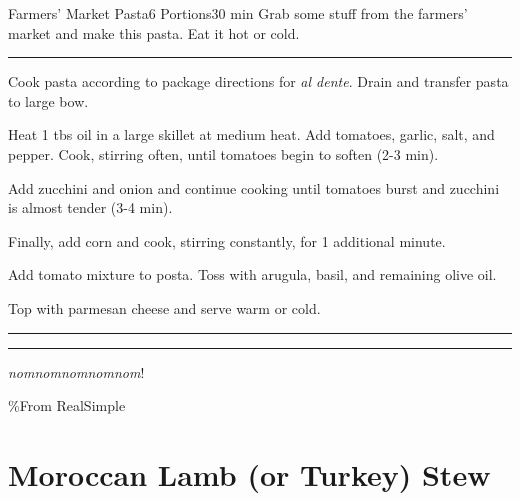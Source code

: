\documentclass[openany]{book}
\begin{document}
\begin{recipe}[FarmersMarketPasta]{Farmers' Market Pasta}{6 Portions}{30 min}
\freeform Grab some stuff from the farmers' market and make this pasta. Eat it hot or cold.
\freeform\rule{\textwidth}{0.05pt}

Cook pasta according to package directions for \textit{al dente}. Drain and transfer pasta to large bow.


Heat 1 tbs oil in a large skillet at medium heat. Add tomatoes, garlic, salt, and pepper. Cook, stirring often, until tomatoes begin to soften (2-3 min).  


Add zucchini and onion and continue cooking until tomatoes burst and zucchini is almost tender (3-4 min).


Finally, add corn and cook, stirring constantly, for 1 additional minute.


Add tomato mixture to posta. Toss with arugula, basil, and remaining olive oil.


Top with parmesan cheese and serve warm or cold.


\freeform\rule{\textwidth}{0.05pt}

\freeform\rule{\textwidth}{0.05pt}
\textit{nomnomnomnomnom}!
\end{recipe}

\%From RealSimple

\chapter{Moroccan Lamb (or Turkey)
Stew}\label{moroccan-lamb-or-turkey-stew}
\end{document}
